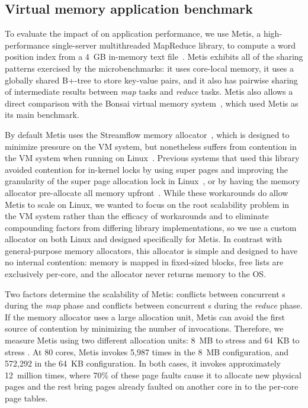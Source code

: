 \subsection{Virtual memory application benchmark}

To evaluate the impact of \vm on application performance, we use
Metis, a high-performance single-server multithreaded MapReduce
library, to compute a word position index from a 4~GB in-memory text
file~\cite{dean:mapreduce,metis:tr}.
%
Metis exhibits all of the sharing patterns exercised by the
microbenchmarks: it uses core-local memory, it uses a globally shared
B+-tree to store key-value pairs, and it also has pairwise sharing of
intermediate results between \emph{map} tasks and \emph{reduce} tasks.
%
Metis also allows a direct comparison with the Bonsai virtual memory
system~\cite{clements:bonsai}, which used Metis as its main benchmark.

By default Metis uses the Streamflow memory
allocator~\cite{schneider:streamflow}, which is designed to minimize
pressure on the VM system, but nonetheless suffers from contention in
the VM system when running on Linux~\cite{clements:bonsai}.  Previous
systems that used this library avoided contention for in-kernel locks
by using super pages and improving the granularity of the super page
allocation lock in Linux~\cite{boyd-wickizer:scaling}, or by having
the memory allocator pre-allocate all memory upfront~\cite{metis:tr}.
While these workarounds do allow Metis to scale on Linux, we wanted to
focus on the root scalability problem in the VM system rather than the
efficacy of workarounds and to eliminate compounding factors from
differing library implementations, so we use a custom allocator on
both Linux and \sys designed specifically for Metis.  In contrast with
general-purpose memory allocators, this allocator is simple and
designed to have no internal contention: memory is mapped in
fixed-sized blocks, free lists are exclusively per-core, and the
allocator never returns memory to the OS.

Two factors determine the scalability of Metis: conflicts between
concurrent s during the \emph{map} phase and conflicts
between concurrent s during the \emph{reduce} phase.
%
If the memory allocator uses a large allocation unit, Metis
can avoid the first source of contention by minimizing the number of
 invocations.
%
Therefore, we measure Metis using two different allocation units: 8~MB
to stress  and 64~KB to stress .
%
At 80 cores, Metis invokes  5,987 times in the 8~MB
configuration, and 572,292 in the 64~KB configuration.
%
In both cases, it invokes  approximately 12~million
times, where 70\% of these page faults cause it to allocate new
physical pages and the rest bring pages already faulted on another
core in to the per-core page tables.

